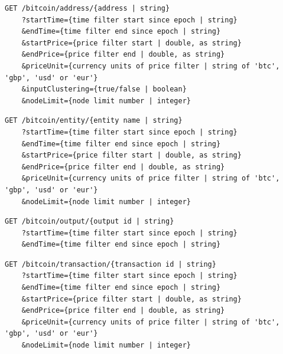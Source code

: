 \begin{lstlisting}[label={lst:address-api}, caption={Get an address using the unique full address. Several optional query parameters for filtering by time, price and enabling clustering and node limiting. \\[0.5cm] }, breaklines=true, basicstyle=\small]
GET /bitcoin/address/{address | string}
    ?startTime={time filter start since epoch | string}
    &endTime={time filter end since epoch | string}
    &startPrice={price filter start | double, as string}
    &endPrice={price filter end | double, as string}
    &priceUnit={currency units of price filter | string of 'btc', 'gbp', 'usd' or 'eur'}
    &inputClustering={true/false | boolean}
    &nodeLimit={node limit number | integer}
\end{lstlisting}

\begin{lstlisting}[caption={Get an entity using the unique name of the entity . All query parameters are optional for filtering.}, breaklines=true, basicstyle=\small]
GET /bitcoin/entity/{entity name | string}
    ?startTime={time filter start since epoch | string}
    &endTime={time filter end since epoch | string}
    &startPrice={price filter start | double, as string}
    &endPrice={price filter end | double, as string}
    &priceUnit={currency units of price filter | string of 'btc', 'gbp', 'usd' or 'eur'}
    &nodeLimit={node limit number | integer}
\end{lstlisting}

\begin{lstlisting}[caption={Get an output with a unique output ID. All query parameters are optional for filtering.}, breaklines=true, basicstyle=\small]
GET /bitcoin/output/{output id | string}
    ?startTime={time filter start since epoch | string}
    &endTime={time filter end since epoch | string}
\end{lstlisting}

\begin{lstlisting}[caption={Get a transaction with a unique transaction ID (txid). All query parameters are optional for filtering.}, breaklines=true, basicstyle=\small]
GET /bitcoin/transaction/{transaction id | string}
    ?startTime={time filter start since epoch | string}
    &endTime={time filter end since epoch | string}
    &startPrice={price filter start | double, as string}
    &endPrice={price filter end | double, as string}
    &priceUnit={currency units of price filter | string of 'btc', 'gbp', 'usd' or 'eur'}
    &nodeLimit={node limit number | integer}
\end{lstlisting}

